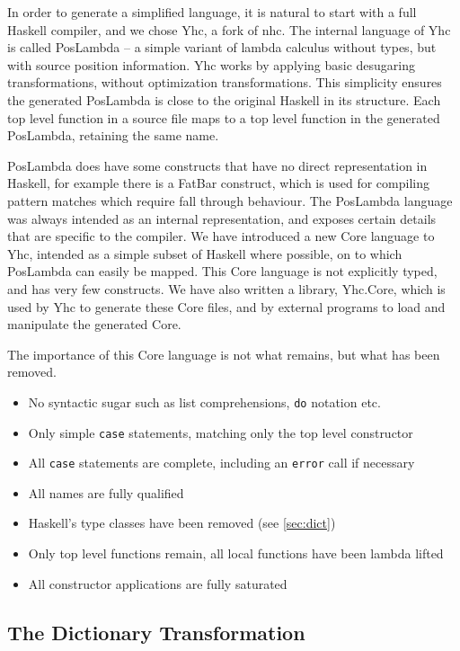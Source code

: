 \documentclass[preprint]{sigplanconf}
\newcommand{\T}[1]{\texttt{#1}}
\begin{document}
In order to generate a simplified language, it is natural to start with a full
Haskell compiler, and we chose Yhc, a fork of nhc. The internal language of Yhc
is called PosLambda -- a simple variant of lambda calculus without types, but
with source position information. Yhc works by applying basic desugaring
transformations, without optimization transformations. This simplicity ensures
the generated PosLambda is close to the original Haskell in its structure. Each
top level function in a source file maps to a top level function in the
generated PosLambda, retaining the same name.

PosLambda does have some constructs that have no direct representation in
Haskell, for example there is a FatBar construct, which is used for compiling
pattern matches which require fall through behaviour. The PosLambda language
was always intended as an internal representation, and exposes certain details
that are specific to the compiler. We have introduced a new Core language to
Yhc, intended as a simple subset of Haskell where possible, on to which
PosLambda can easily be mapped. This Core language is not explicitly typed, and
has very few constructs. We have also written a library, Yhc.Core, which is
used by Yhc to generate these Core files, and by external programs to load and
manipulate the generated Core.

The importance of this Core language is not what remains, but what has been
removed.

\begin{itemize}
\item No syntactic sugar such as list comprehensions, \T{do} notation etc.
\item Only simple \T{case} statements, matching only the top level constructor
\item All \T{case} statements are complete, including an \T{error} call if
necessary
\item All names are fully qualified
\item Haskell's type classes have been removed (see \ref{sec:dict})
\item Only top level functions remain, all local functions have been lambda lifted
\item All constructor applications are fully saturated
\end{itemize}

\subsection{The Dictionary Transformation}
\end{document}
